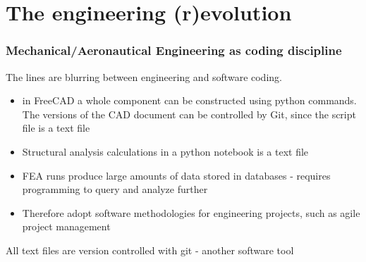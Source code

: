 \documentclass{beamer}
\begin{document}

\section{The engineering (r)evolution}


\begin{frame}
\frametitle{Mechanical/Aeronautical Engineering as coding discipline}

The lines are blurring between engineering and software coding.

\begin{itemize}
\item in FreeCAD a whole component can be constructed using python commands.  The versions of the CAD document can be controlled by Git, since the script file is a text file
\item Structural analysis calculations in a python notebook is a text file 
\item FEA runs produce large amounts of data stored in databases - requires programming to query and analyze further
\item Therefore adopt software methodologies for  engineering projects, such as agile project management
\end{itemize}

All text files are version controlled with git - another software tool

\end{frame}
\end{document}
